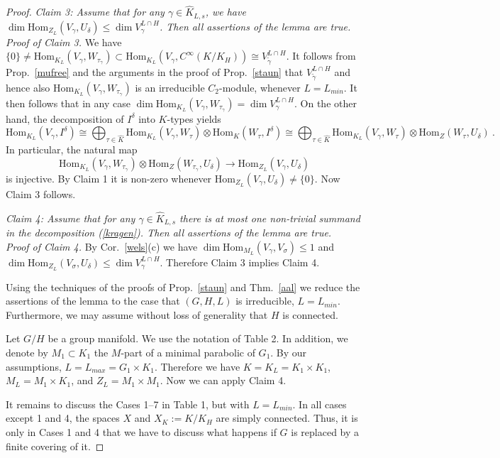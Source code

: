 \documentclass[10]{amsart}
\theoremstyle{remark}
\theoremstyle{definition}
\numberwithin{equation}{section}
\newcommand{\Hom}{\mathrm{Hom}}
\begin{document}
{\begin{proof}
{\it Claim 3: Assume that for any $\gamma\in\widehat K_{L,s}$, we have $\dim \Hom_{Z_L}(V_\gamma,U_\delta)\le\dim V_\gamma^{L\cap H}$. Then all assertions of the lemma are true.}\\
{\it Proof of Claim 3.}  We have $\{0\}\ne\Hom_{K_L}(V_\gamma, W_{\tau_\gamma})\subset \Hom_{K_L}(V_\gamma,C^\infty(K/K_H))\cong V_{\tilde\gamma}^{L\cap H}$.
It follows from Prop.~\ref{mufree} and the arguments in the proof of Prop.~\ref{staun} that $V_{\tilde\gamma}^{L\cap H}$ and hence also $\Hom_{K_L}(V_\gamma, W_{\tau_\gamma})$
is an irreducible $C_2$-module, whenever $L=L_{min}$. It then follows that in any case $\dim\Hom_{K_L}(V_\gamma, W_{\tau_\gamma})=\dim V_\gamma^{L\cap H}$.
On the other hand, the decomposition of $I^\delta$ into $K$-types yields
$$ \Hom_{K_L}(V_\gamma,I^\delta)\cong\bigoplus_{\tau\in\widehat K} \Hom_{K_L}(V_\gamma, W_\tau)\otimes \Hom_{K}( W_\tau, I^\delta)\cong 
\bigoplus_{\tau\in\widehat K} \Hom_{K_L}(V_\gamma, W_\tau)\otimes \Hom_{Z}( W_\tau,U_\delta)\ .$$
In particular, the natural map
$$  \Hom_{K_L}(V_\gamma, W_{\tau_\gamma})\otimes \Hom_{Z}( W_{\tau_\gamma},U_\delta)\rightarrow \Hom_{Z_L}(V_\gamma,U_\delta)$$
is injective. By Claim 1 it is non-zero whenever $\Hom_{Z_L}(V_\gamma,U_\delta)\ne\{0\}$. Now Claim 3 follows.

{\it Claim 4: Assume that for any $\gamma\in\widehat K_{L,s}$ there is at most one non-trivial summand in the decomposition (\ref{kragen}). Then all assertions of the lemma are true.}\\
{\it Proof of Claim 4.} By Cor.~\ref{wels}(c) we have $\dim\Hom_{M_L}(V_\gamma,V_\sigma)\le 1$ and $\dim\Hom_{Z_L}(V_\sigma,U_\delta)\le \dim V_\gamma^{L\cap H}$. Therefore Claim 3 implies Claim 4.

Using the techniques of the proofs of Prop.~\ref{staun} and Thm.~\ref{aal} we reduce the assertions of the lemma to the case that $(G,H,L)$ is irreducible, $L=L_{min}$.
Furthermore, we may assume without loss of generality that $H$ is connected. 

Let $G/H$ be a group manifold. We use the notation of Table 2. In addition, we denote by $M_1\subset K_1$ the $M$-part of a minimal parabolic of $G_1$.  By our assumptions, $L=L_{max}=G_1\times K_1$. Therefore we have $K=K_L=K_1\times K_1$, $M_L=M_1\times K_1$, and $Z_L=M_1\times M_1$. Now we can apply Claim 4.

It remains to discuss the Cases 1--7 in Table 1, but with $L=L_{min}$. In all cases except 1 and 4, the spaces $X$ and $X_K:=K/K_H$ are simply connected. Thus, it is only in Cases 1 and 4 that we have to discuss what happens if $G$ is replaced by a finite covering of it.


\end{proof}}
\end{document}
